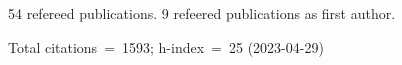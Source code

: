 54 refereed publications. 9 refeered publications as first author.

Total citations~=~1593; h-index~=~25 (2023-04-29)